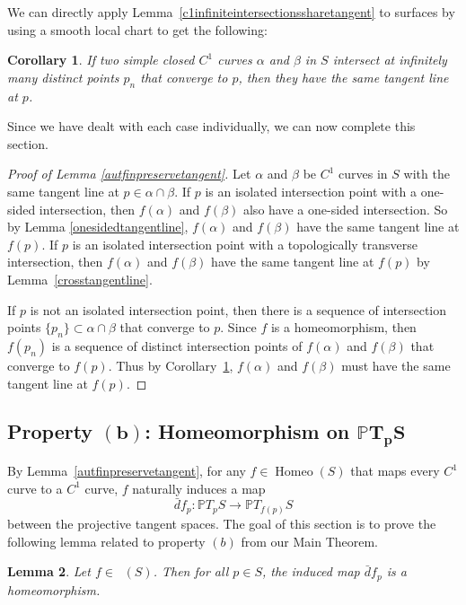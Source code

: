\documentclass[sn-mathphys-num]{sn-jnl}%
\theoremstyle{thmstyleone}%
\newtheorem{lemma}{Lemma}[section]
\newtheorem{cor}[lemma]{Corollary}
\theoremstyle{thmstyletwo}%
\theoremstyle{thmstylethree}%
\DeclareMathOperator{\homeo}{Homeo}
\DeclareMathOperator{\thomeo}{Homeo^{1}}
\begin{document}
We can directly apply Lemma~\ref{c1infiniteintersectionssharetangent} to surfaces by using a smooth local chart to get the following:

\begin{cor}\label{c1infinitesharetangentline}
If two simple closed $C^1$ curves $\alpha$ and $\beta$ in $S$ intersect at infinitely many distinct points $p_n$ that converge to $p$, then they have the same tangent line at $p$. 
\end{cor}

Since we have dealt with each case individually, we can now complete this section.

\begin{proof}[Proof of Lemma \ref{autfinpreservetangent}]
Let $\alpha$ and $\beta$ be $C^1$ curves in $S$ with the same tangent line at $p \in \alpha \cap \beta$.  If $p$ is an isolated intersection point with a one-sided intersection, then $f(\alpha)$ and $f(\beta)$ also have a one-sided intersection. So by Lemma \ref{onesidedtangentline},  $f(\alpha)$ and $f(\beta)$ have the same tangent line at $f(p)$.  
If $p$ is an isolated intersection point with a topologically transverse intersection, then $f(\alpha)$ and $f(\beta)$ have the same tangent line at $f(p)$ by Lemma~\ref{crosstangentline}. 

If $p$ is not an isolated intersection point, then there is a sequence of intersection points $\{p_n\} \subset \alpha \cap \beta$ that converge to $p$.  Since $f$ is a homeomorphism, then $f(p_n)$ is a sequence of distinct intersection points of $f(\alpha)$ and $f(\beta)$ that converge to $f(p)$. Thus by Corollary~\ref{c1infinitesharetangentline},  $f(\alpha)$ and $f(\beta)$ must have the same tangent line at $f(p)$. 
\end{proof}

\subsection{Property $\mathbf{(b)}$: Homeomorphism on $\mathbf{\mathbb{P}T_pS}$}
By Lemma~\ref{autfinpreservetangent},  for any $f \in \homeo(S)$ that maps every $C^1$ curve to a $C^1$ curve,  $f$ naturally induces a map
$$\bar{d}f_p: \mathbb{P}T_pS \rightarrow \mathbb{P}T_{f(p)}S$$
between the projective tangent spaces.  The goal of this section is to prove the following lemma related to property $(b)$ from our Main Theorem.

\begin{lemma}\label{projtangentspaceishomeo}
Let $f \in \thomeo(S)$.  Then for all $p \in S$,  the induced map $\bar{d}f_p$ is a homeomorphism.
\end{lemma}
\end{document}
